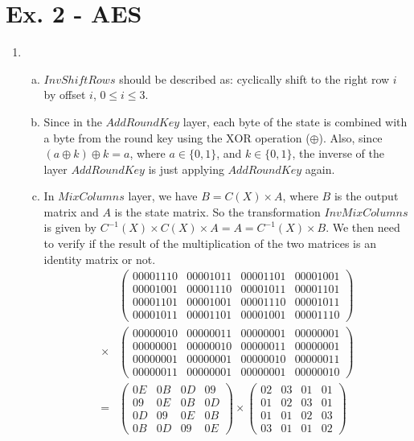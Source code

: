 \documentclass[11pt,a4paper]{article}
\begin{document}
\section*{Ex. 2 - AES}
\begin{enumerate}
	\item
	\begin{enumerate}[(a)]
		\item $\mathit{InvShiftRows}$ should be described as: cyclically shift to the right row $i$ by offset $i$, $0 \leq i \leq 3$.
		
		\item Since in the $\mathit{AddRoundKey}$ layer, each byte of the state is combined with a byte from the round key using the $\mathrm{XOR}$ operation ($\oplus$). Also, since $(a\oplus k)\oplus k = a$, where $a\in \{0, 1\}$, and $k\in \{0, 1\}$, the inverse of the layer $\mathit{AddRoundKey}$ is just applying $\mathit{AddRoundKey}$ again.
		
		\item In $\mathit{MixColumns}$ layer, we have $B = C(X) \times A$, where $B$ is the output matrix and $A$ is the state matrix. So the transformation $\mathit{InvMixColumns}$ is given by $C^{-1}(X) \times C(X) \times A = A = C^{-1}(X) \times B$. We then need to verify if the result of the multiplication of the two matrices is an identity matrix or not.
		\begin{align*}
			& \begin{pmatrix}
				00001110 & 00001011 & 00001101 & 00001001 \\
				00001001 & 00001110 & 00001011 & 00001101 \\
				00001101 & 00001001 & 00001110 &  00001011 \\
				00001011 & 00001101 & 00001001 & 00001110
			\end{pmatrix} \\
			\times &
			\begin{pmatrix}
				00000010 & 00000011 & 00000001 & 00000001 \\
				00000001 & 00000010 & 00000011 & 00000001 \\
				00000001 & 00000001 & 00000010 & 00000011 \\
				00000011 & 00000001 & 00000001 & 00000010
			\end{pmatrix} \\
			= &
			\begin{pmatrix}
				0E & 0B & 0D & 09 \\
				09 & 0E & 0B & 0D \\
				0D & 09 & 0E & 0B \\
				0B & 0D & 09 & 0E
			\end{pmatrix}
			\times
			\begin{pmatrix}
				02 & 03 & 01 & 01 \\
				01 & 02 & 03 & 01 \\
				01 & 01 & 02 & 03 \\
				03 & 01 & 01 & 02
			\end{pmatrix}			
		\end{align*}
	\end{enumerate}
	

\end{enumerate}
\end{document}

